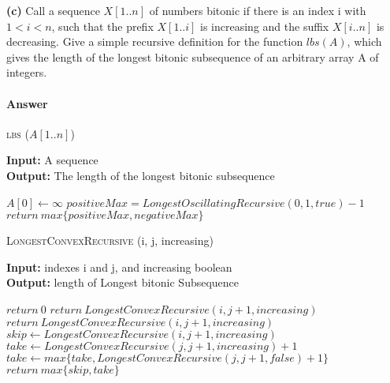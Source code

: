 \documentclass{article}
\begin{document}
{\bf (c)} Call a sequence $X[1.. n]$ of numbers bitonic if there is an index i with
$1 < i < n$, such that the prefix $X[1.. i]$ is increasing and the suffix
$X[i .. n]$ is decreasing. Give a simple recursive definition for the function
$lbs(A)$, which gives the length of the longest bitonic subsequence of an
arbitrary array A of integers.

\paragraph{Answer}

\begin{algorithm} \caption{\textsc{lbs} ($A[1..n]$)}\label{alg:seb}
    {\bf Input:} A sequence\\
    {\bf Output:} The length of the longest bitonic subsequence
    \begin{algorithmic}[1]
        \State$A[0] \gets \infty$
        \State$positiveMax = LongestOscillatingRecursive(0, 1, true) -1$
        \State$return\ max\{positiveMax, negativeMax\}$
    \end{algorithmic}
\end{algorithm}

\begin{algorithm} \caption{\textsc{LongestConvexRecursive} (i, j, increasing)}\label{alg:seb}
    {\bf Input:} indexes i and j, and increasing boolean\\
    {\bf Output:} length of Longest bitonic Subsequence
    \begin{algorithmic}[1]
            \State$return\ 0$
                \State$return\ LongestConvexRecursive(i, j+1, increasing)$
            \EndIf{}
        \Else{}
                \State$return\ LongestConvexRecursive(i, j+1, increasing)$
            \EndIf{}
        \EndIf{}
        \State$skip \gets LongestConvexRecursive(i, j+1, increasing)$
        \State$take \gets LongestConvexRecursive(j, j+1, increasing) +1$
            \State$take \gets max\{take, LongestConvexRecursive(j, j+1, false) +1\}$
        \EndIf{}
        \State$return\ max\{skip, take\}$
    \end{algorithmic}
\end{algorithm}
\todo{}


\end{document}
